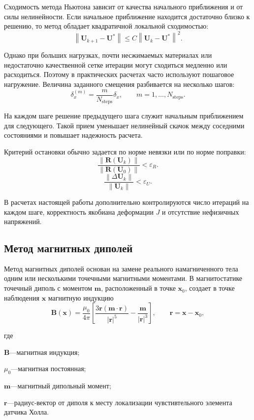 \documentclass[14pt,a4paper]{extarticle}
\newif\ifwherefirst
\newcommand{\whereitem}[2]{%
    \ifwherefirst
        \wherefirstfalse
        #1\hspace{0.25em}---\hspace{0.25em}#2\par
    \else
        \noindent\hspace*{\parindent}\hphantom{где\enspace}#1\hspace{0.25em}---\hspace{0.25em}#2\par
    \fi
}
\newenvironment{whereblock}{%
    \vspace*{-1.55\baselineskip}%
    \begingroup
    \singlespacing
    \wherefirsttrue
    \par\indent где\enspace\ignorespaces
}{%
    \par\endgroup
    \par\vspace{\baselineskip}
}
\begin{document}
Сходимость метода Ньютона зависит от качества начального приближения и от силы нелинейности. Если начальное приближение находится достаточно близко к решению, то метод обладает квадратичной локальной сходимостью:
\begin{equation}
    \left\|\mathbf{U}_{k+1}-\mathbf{U}^{*}\right\|
    \le
    C
    \left\|\mathbf{U}_{k}-\mathbf{U}^{*}\right\|^2.
\end{equation}

Однако при больших нагрузках, почти несжимаемых материалах или недостаточно качественной сетке итерации могут сходиться медленно или расходиться. Поэтому в практических расчетах часто используют пошаговое нагружение. Величина заданного смещения разбивается на несколько шагов:
\begin{equation}
    \delta_x^{(m)}
    =
    \frac{m}{N_{\mathrm{steps}}}\delta_x,
    \qquad
    m=1,\ldots,N_{\mathrm{steps}}.
\end{equation}

На каждом шаге решение предыдущего шага служит начальным приближением для следующего. Такой прием уменьшает нелинейный скачок между соседними состояниями и повышает надежность расчета.

Критерий остановки обычно задается по норме невязки или по норме поправки:
\begin{equation}
    \frac{\left\|\mathbf{R}(\mathbf{U}_k)\right\|}{\left\|\mathbf{R}(\mathbf{U}_0)\right\|}
    <
    \varepsilon_R.
\end{equation}
\begin{equation}
    \frac{\left\|\Delta\mathbf{U}_k\right\|}{\left\|\mathbf{U}_k\right\|}
    <
    \varepsilon_U.
\end{equation}

В расчетах настоящей работы дополнительно контролируются число итераций на каждом шаге, корректность якобиана деформации \(J\) и отсутствие нефизичных напряжений.

\subsection{Метод магнитных диполей}

Метод магнитных диполей основан на замене реального намагниченного тела одним или несколькими точечными магнитными моментами. В магнитостатике точечный диполь с моментом \(\mathbf{m}\), расположенный в точке \(\mathbf{x}_0\), создает в точке наблюдения \(\mathbf{x}\) магнитную индукцию
\begin{equation}
    \mathbf{B}(\mathbf{x})
    =
    \frac{\mu_0}{4\pi}
    \left[
        \frac{3\mathbf{r}\left(\mathbf{m}\cdot\mathbf{r}\right)}{\left|\mathbf{r}\right|^5}
        -
        \frac{\mathbf{m}}{\left|\mathbf{r}\right|^3}
    \right],
    \qquad
    \mathbf{r}=\mathbf{x}-\mathbf{x}_0,
\end{equation}
\begin{whereblock}
\whereitem{\(\mathbf{B}\)}{магнитная индукция;}
\whereitem{\(\mu_0\)}{магнитная постоянная;}
\whereitem{\(\mathbf{m}\)}{магнитный дипольный момент;}
\whereitem{\(\mathbf{r}\)}{радиус-вектор от диполя к месту локализации чувстивтельного элемента датчика Холла.}
\end{whereblock}
\end{document}
